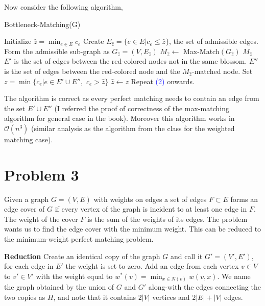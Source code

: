 \documentclass{article}
\numberwithin{equation}{section}
\newcommand{\card}[1]{\left|#1\right|}
\begin{document}
Now consider the following algorithm, 
\begin{algorithm}[H]
    \scriptsize
    \caption{Bottleneck-Matching(G)}
    \begin{algorithmic}[1]
        \State Initialize $\hat{z} = \min_{e\in E} c_e$
        \State Create $E_{\hat{z}} = \{e\in E \vert c_e \le \hat{z}\}$, the set of admissible edges. 
        \State Form the admissible sub-graph as $G_{\hat{z}} = (V, E_{\hat{z}} )$
        \State $M_{\hat{z}} \leftarrow$ Max-Match$(G_{\hat{z}})$
            \Return $M_{\hat{z}}$
        \Else 
            \State $E'$ is the set of edges between the red-colored nodes not in the same blossom. 
            \State $E''$ is the set of edges between the red-colored node and the $M_{\hat{z}}$-matched node. 
            \State Set $z = \min\{c_e \vert e \in E'\cup E'', \, \, c_e > \hat{z} \}$
            \State $\hat{z} \leftarrow z$
            \State Repeat \textcolor{blue}{(2)} onwards. 
        \EndIf
    \end{algorithmic}
\end{algorithm}

The algorithm is correct as every perfect matching needs to contain an edge from the set $E' \cup E''$ (I referred the proof of correctness of the max-matching algorithm for general case in the book). Moreover this algorithm works in $\mathcal{O}(n^3)$ (similar analysis as the algorithm from the class for the weighted matching case). 
\newpage
\section{Problem 3}
Given a graph $G =(V, E)$ with weights on edges a set of edges $F\subset E$ forms an edge cover of $G$ if every vertex of the graph is incident to at least one edge in $F$. The weight of the cover $F$ is the sum of the weights of its edges. The problem wants us to find the edge cover with the minimum weight. This can be reduced to the minimum-weight perfect matching problem. 

\textbf{Reduction} Create an identical copy of the graph $G$ and call it $G' = (V', E')$, for each edge in $E'$ the weight is set to zero. Add an edge from each vertex $v \in V$ to $v' \in V'$ with the weight equal to $w^*(v) = \min_{x\in N(v)} w(v, x)$. We name the graph obtained by the union of $G$ and $G'$ along-with the edges connecting the two copies as $H$, and note that it contains $2\card{V}$ vertices and $2\card{E} + \card{V}$ edges.
\end{document}
